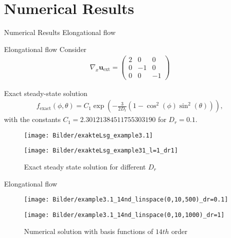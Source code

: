 \section{Numerical Results}

\begin{frame}{Numerical Results}
	\centering
	Elongational flow
\end{frame}


\begin{frame}{Elongational flow}
	\scriptsize
	Consider
	\begin{align*}
		\nabla_{x} \boldsymbol{u}_{\mathrm{ext}}=\left(\begin{array}{ccc}
			2 & 0 & 0 \\
			0 & -1 & 0 \\
			0 & 0 & -1
		\end{array}\right) %
	\end{align*}
	
	Exact steady-state solution
	\begin{align}
		f_{\text {exact}}(\phi, \theta)=C_1 \exp \left(-\frac{3}{2 D_{\mathrm{r}}}\left(1-\cos ^2(\phi) \sin ^2(\theta)\right)\right),
	\end{align}
	with the constants $C_1 = 2.30121384511755303190$ for $D_r=0.1$.
	
	\begin{figure}
		\begin{minipage}{0.4\textwidth}
			\texttt{[image: Bilder/exakteLsg\_example3.1]}
		\end{minipage}
		\hfill 
		\begin{minipage}{0.4\textwidth}
			\texttt{[image: Bilder/exakteLsg\_example31\_l=1\_dr1]}
		\end{minipage}
		\caption{Exact steady state solution for different $D_r$}
	\end{figure}
\end{frame}



\begin{frame}{Elongational flow}
	\begin{figure}
		\begin{minipage}{0.48\textwidth}
			\texttt{[image: Bilder/example3.1\_14nd\_linspace(0,10,500)\_dr=0.1]}
		\end{minipage}
		\hfill 
		\begin{minipage}{0.48\textwidth}
			\texttt{[image: Bilder/example3.1\_14nd\_linspace(0,10,1000)\_dr=1]}
		\end{minipage}
		\caption{Numerical solution with basis functions of $14th$ order}
	\end{figure}
\end{frame}

